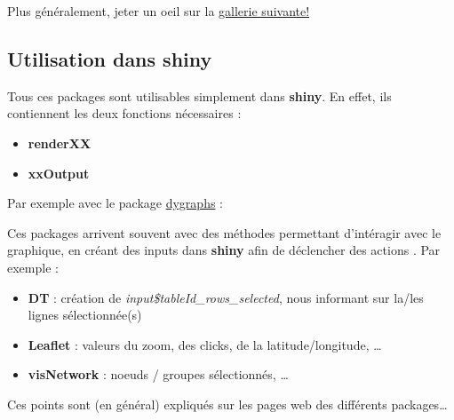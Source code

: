 \documentclass[
]{article}
\newenvironment{Shaded}{\begin{snugshade}}{\end{snugshade}}
\newcommand{\AttributeTok}[1]{\textcolor[rgb]{0.77,0.63,0.00}{#1}}
\newcommand{\CommentTok}[1]{\textcolor[rgb]{0.56,0.35,0.01}{\textit{#1}}}
\newcommand{\FunctionTok}[1]{\textcolor[rgb]{0.00,0.00,0.00}{#1}}
\newcommand{\NormalTok}[1]{#1}
\newcommand{\OtherTok}[1]{\textcolor[rgb]{0.56,0.35,0.01}{#1}}
\newcommand{\SpecialCharTok}[1]{\textcolor[rgb]{0.00,0.00,0.00}{#1}}
\newcommand{\StringTok}[1]{\textcolor[rgb]{0.31,0.60,0.02}{#1}}
\providecommand{\tightlist}{%
  \setlength{\itemsep}{0pt}\setlength{\parskip}{0pt}}
\begin{document}
Plus généralement, jeter un oeil sur la
\href{http://gallery.htmlwidgets.org/}{gallerie suivante!}

\hypertarget{utilisation-dans-shiny}{%
\subsection{Utilisation dans shiny}\label{utilisation-dans-shiny}}

Tous ces packages sont utilisables simplement dans \textbf{shiny}. En
effet, ils contiennent les deux fonctions nécessaires :

\begin{itemize}
\tightlist
\item
  \textbf{renderXX}
\item
  \textbf{xxOutput}
\end{itemize}

Par exemple avec le package
\href{http://rstudio.github.io/dygraphs/}{dygraphs} :

\begin{Shaded}
\end{Shaded}

Ces packages arrivent souvent avec des méthodes permettant d'intéragir
avec le graphique, en créant des inputs dans \textbf{shiny} afin de
déclencher des actions . Par exemple :

\begin{itemize}
\tightlist
\item
  \textbf{DT} : création de \emph{input\$tableId\_rows\_selected}, nous
  informant sur la/les lignes sélectionnée(s)
\item
  \textbf{Leaflet} : valeurs du zoom, des clicks, de la
  latitude/longitude, \ldots{}
\item
  \textbf{visNetwork} : noeuds / groupes sélectionnés, \ldots{}
\end{itemize}

Ces points sont (en général) expliqués sur les pages web des différents
packages\ldots{}
\end{document}
